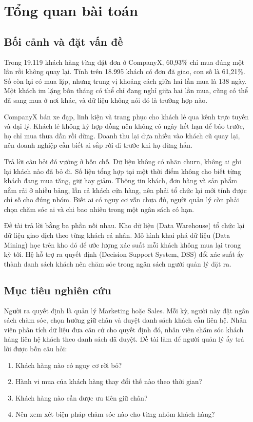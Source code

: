\section{Tổng quan bài toán}
\subsection{Bối cảnh và đặt vấn đề}
Trong 19.119 khách hàng từng đặt đơn ở CompanyX, 60,93\% chỉ mua đúng một lần rồi không quay lại. Tính trên 18.995 khách có đơn đã giao, con số là 61,21\%. Số còn lại có mua lặp, nhưng trung vị khoảng cách giữa hai lần mua là 138 ngày. Một khách im lặng bốn tháng có thể chỉ đang nghỉ giữa hai lần mua, cũng có thể đã sang mua ở nơi khác, và dữ liệu không nói đó là trường hợp nào.

CompanyX bán xe đạp, linh kiện và trang phục cho khách lẻ qua kênh trực tuyến và đại lý. Khách lẻ không ký hợp đồng nên không có ngày hết hạn để báo trước, họ chỉ mua thưa dần rồi dừng. Doanh thu lại dựa nhiều vào khách cũ quay lại, nên doanh nghiệp cần biết ai sắp rời đi trước khi họ dừng hẳn.

Trả lời câu hỏi đó vướng ở bốn chỗ. Dữ liệu không có nhãn churn, không ai ghi lại khách nào đã bỏ đi. Số liệu tổng hợp tại một thời điểm không cho biết từng khách đang mua tăng, giữ hay giảm. Thông tin khách, đơn hàng và sản phẩm nằm rải ở nhiều bảng, lẫn cả khách cửa hàng, nên phải tổ chức lại mới tính được chỉ số cho đúng nhóm. Biết ai có nguy cơ vẫn chưa đủ, người quản lý còn phải chọn chăm sóc ai và chi bao nhiêu trong một ngân sách có hạn.

Đề tài trả lời bằng ba phần nối nhau. Kho dữ liệu (Data Warehouse) tổ chức lại dữ liệu giao dịch theo từng khách cá nhân. Mô hình khai phá dữ liệu (Data Mining) học trên kho đó để ước lượng xác suất mỗi khách không mua lại trong kỳ tới. Hệ hỗ trợ ra quyết định (Decision Support System, DSS) đổi xác suất ấy thành danh sách khách nên chăm sóc trong ngân sách người quản lý đặt ra.

\subsection{Mục tiêu nghiên cứu}
Người ra quyết định là quản lý Marketing hoặc Sales. Mỗi kỳ, người này đặt ngân sách chăm sóc, chọn hướng giữ chân và duyệt danh sách khách cần liên hệ. Nhân viên phân tích dữ liệu đưa căn cứ cho quyết định đó, nhân viên chăm sóc khách hàng liên hệ khách theo danh sách đã duyệt. Đề tài làm để người quản lý ấy trả lời được bốn câu hỏi:
\begin{enumerate}[label=\arabic*.]
    \item Khách hàng nào có nguy cơ rời bỏ?
    \item Hành vi mua của khách hàng thay đổi thế nào theo thời gian?
    \item Khách hàng nào cần được ưu tiên giữ chân?
    \item Nên xem xét biện pháp chăm sóc nào cho từng nhóm khách hàng?
\end{enumerate}

